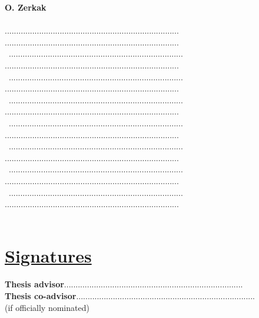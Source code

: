 \documentclass[11pt,titlepage]{article}
\begin{document}
\noindent\textbf{O. Zerkak}\\\\
............................................................................
............................................................................\\\
............................................................................
............................................................................\\\
............................................................................
............................................................................\\\
............................................................................
............................................................................\\\
............................................................................
............................................................................\\\
............................................................................
............................................................................\\\
............................................................................
............................................................................\\\
............................................................................
............................................................................\\\

\section*{\underline{Signatures}\\}
\noindent \textbf{Thesis advisor}\hspace{6.25cm}..............................................................................\vspace{0.5cm}\\

\noindent \textbf{Thesis co-advisor}\hspace{5.7cm}..............................................................................\\
\noindent  (if officially nominated)\\\\
\end{document}
